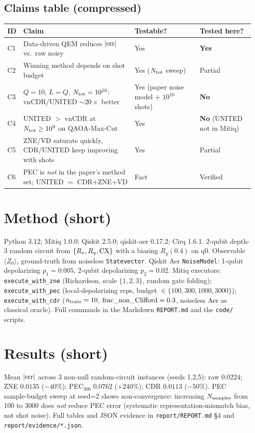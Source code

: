 \documentclass[11pt]{article}
\begin{document}
\subsection{Claims table (compressed)}
\begin{center}
\begin{tabular}{@{}lp{9cm}ll@{}}
\toprule
ID & Claim & Testable? & Tested here? \\
\midrule
C1 & Data-driven QEM reduces $|{\rm err}|$ vs.\ raw noisy & Yes & \textbf{Yes} \\
C2 & Winning method depends on shot budget & Yes ($N_{\rm tot}$ sweep) & Partial \\
C3 & $Q=10$, $L=Q$, $N_{\rm tot}=10^{10}$: vnCDR/UNITED $\sim20\times$ better & Yes (paper noise model + $10^{10}$ shots) & \textbf{No} \\
C4 & UNITED $>$ vnCDR at $N_{\rm tot}\geq 10^9$ on QAOA-Max-Cut & Yes & \textbf{No} (UNITED not in Mitiq) \\
C5 & ZNE/VD saturate quickly, CDR/UNITED keep improving with shots & Yes & Partial \\
C6 & PEC is \emph{not} in the paper's method set; UNITED $=$ CDR+ZNE+VD & Fact & Verified \\
\bottomrule
\end{tabular}
\end{center}

\section{Method (short)}
Python 3.12; Mitiq 1.0.0; Qiskit 2.5.0; qiskit-aer 0.17.2; Cirq 1.6.1.
2-qubit depth-3 random circuit from $\{R_x,R_y,{\rm CX}\}$ with a
biasing $R_y(0.4)$ on q0.  Observable $\langle Z_0\rangle$, ground-truth
from noiseless \texttt{Statevector}.  Qiskit Aer
\texttt{NoiseModel}: 1-qubit depolarizing $p_1=0.005$, 2-qubit
depolarizing $p_2=0.02$.  Mitiq executors: \texttt{execute\_with\_zne}
(Richardson, scale $\{1,2,3\}$, random gate folding);
\texttt{execute\_with\_pec} (local-depolarizing reps, budget
$\in\{100,300,1000,3000\}$); \texttt{execute\_with\_cdr}
($n_{\rm train}=10$, ${\rm frac\_non\_Clifford}=0.3$, noiseless Aer as
classical oracle).  Full commands in the Markdown \texttt{REPORT.md} and
the \texttt{code/} scripts.

\section{Results (short)}
Mean $|{\rm err}|$ across 3 non-null random-circuit instances (seeds 1,2,5):
raw $0.0224$; ZNE $0.0135$ ($-40\%$); PEC$_{300}$ $0.0762$ ($+240\%$);
CDR $0.0113$ ($-50\%$).  PEC sample-budget sweep at seed=2 shows
non-convergence: increasing $N_{\rm samples}$ from 100 to 3000 does
\emph{not} reduce PEC error (systematic representation-mismatch
bias, not shot noise).  Full tables and JSON evidence in
\texttt{report/REPORT.md} \S 4 and \texttt{report/evidence/*.json}.
\end{document}
